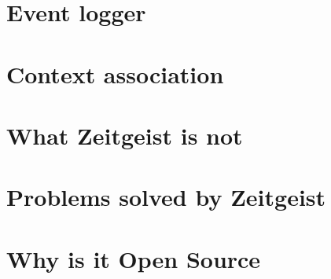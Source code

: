 \section{Event logger}
\section{Context association}
\section{What Zeitgeist is not}
\section{Problems solved by Zeitgeist}
\section{Why is it Open Source}
